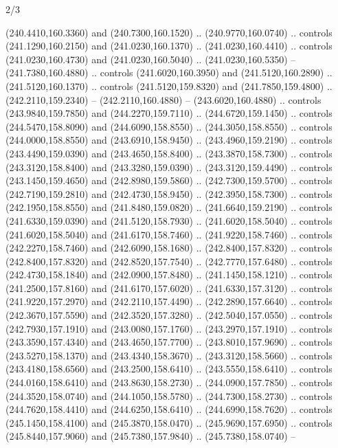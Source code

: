 \begin{flagdescription}{2/3}
\begin{scope}[xshift=0.5\flaglength,yshift=0.5\flagwidth,scale=\flagwidth/259.2]
\begin{scope}[y=0.8pt, x=0.8pt, yscale=-1,shift={(-243,-162)}]
      (240.4410,160.3360) and (240.7300,160.1520) .. (240.9770,160.0740) .. controls
      (241.1290,160.2150) and (241.0230,160.1370) .. (241.0230,160.4410) .. controls
      (241.0230,160.4730) and (241.0230,160.5040) .. (241.0230,160.5350) --
      (241.7380,160.4880) .. controls (241.6020,160.3950) and (241.5120,160.2890) ..
      (241.5120,160.1370) .. controls (241.5120,159.8320) and (241.7850,159.4800) ..
      (242.2110,159.2340) -- (242.2110,160.4880) -- (243.6020,160.4880) .. controls
      (243.9840,159.7850) and (244.2270,159.7110) .. (244.6720,159.1450) .. controls
      (244.5470,158.8090) and (244.6090,158.8550) .. (244.3050,158.8550) .. controls
      (244.0000,158.8550) and (243.6910,158.9450) .. (243.4960,159.2190) .. controls
      (243.4490,159.0390) and (243.4650,158.8400) .. (243.3870,158.7300) .. controls
      (243.3120,158.8400) and (243.3280,159.0390) .. (243.3120,159.4490) .. controls
      (243.1450,159.4650) and (242.8980,159.5860) .. (242.7300,159.5700) .. controls
      (242.7190,159.2810) and (242.4730,158.9450) .. (242.3950,158.7300) .. controls
      (242.1950,158.8550) and (241.8480,159.0820) .. (241.6640,159.2190) .. controls
      (241.6330,159.0390) and (241.5120,158.7930) .. (241.6020,158.5040) .. controls
      (241.6020,158.5040) and (241.6170,158.7460) .. (241.9220,158.7460) .. controls
      (242.2270,158.7460) and (242.6090,158.1680) .. (242.8400,157.8320) .. controls
      (242.8400,157.8320) and (242.8520,157.7540) .. (242.7770,157.6480) .. controls
      (242.4730,158.1840) and (242.0900,157.8480) .. (241.1450,158.1210) .. controls
      (241.2500,157.8160) and (241.6170,157.6020) .. (241.6330,157.3120) .. controls
      (241.9220,157.2970) and (242.2110,157.4490) .. (242.2890,157.6640) .. controls
      (242.3670,157.5590) and (242.3520,157.3280) .. (242.5040,157.0550) .. controls
      (242.7930,157.1910) and (243.0080,157.1760) .. (243.2970,157.1910) .. controls
      (243.3590,157.4340) and (243.4650,157.7700) .. (243.8010,157.9690) .. controls
      (243.5270,158.1370) and (243.4340,158.3670) .. (243.3120,158.5660) .. controls
      (243.4180,158.6560) and (243.2500,158.6410) .. (243.5550,158.6410) .. controls
      (244.0160,158.6410) and (243.8630,158.2730) .. (244.0900,157.7850) .. controls
      (244.3520,158.0740) and (244.1050,158.5780) .. (244.7300,158.2730) .. controls
      (244.7620,158.4410) and (244.6250,158.6410) .. (244.6990,158.7620) .. controls
      (245.1450,158.4100) and (245.3870,158.0470) .. (245.9690,157.6950) .. controls
      (245.8440,157.9060) and (245.7380,157.9840) .. (245.7380,158.0740) --

\end{scope}
\end{scope}
\end{flagdescription}
